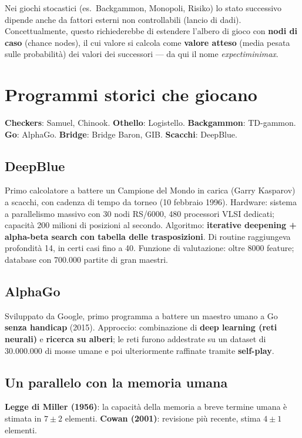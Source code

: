\documentclass[11pt,a4paper]{report}
\begin{document}
Nei giochi stocastici (es.\ Backgammon, Monopoli, Risiko) lo stato successivo dipende anche da fattori esterni non controllabili (lancio di dadi). Concettualmente, questo richiederebbe di estendere l'albero di gioco con \textbf{nodi di caso} (chance nodes), il cui valore si calcola come \textbf{valore atteso} (media pesata sulle probabilità) dei valori dei successori --- da qui il nome \emph{expectiminimax}.

\section{Programmi storici che giocano}

\textbf{Checkers}: Samuel, Chinook. \textbf{Othello}: Logistello. \textbf{Backgammon}: TD-gammon. \textbf{Go}: AlphaGo. \textbf{Bridge}: Bridge Baron, GIB. \textbf{Scacchi}: DeepBlue.

\subsection*{DeepBlue}

Primo calcolatore a battere un Campione del Mondo in carica (Garry Kasparov) a scacchi, con cadenza di tempo da torneo (10 febbraio 1996). Hardware: sistema a parallelismo massivo con 30 nodi RS/6000, 480 processori VLSI dedicati; capacità 200 milioni di posizioni al secondo. Algoritmo: \textbf{iterative deepening + alpha-beta search con tabella delle trasposizioni}. Di routine raggiungeva profondità 14, in certi casi fino a 40. Funzione di valutazione: oltre 8000 feature; database con 700.000 partite di gran maestri.

\subsection*{AlphaGo}

Sviluppato da Google, primo programma a battere un maestro umano a Go \textbf{senza handicap} (2015). Approccio: combinazione di \textbf{deep learning (reti neurali)} e \textbf{ricerca su alberi}; le reti furono addestrate su un dataset di 30.000.000 di mosse umane e poi ulteriormente raffinate tramite \textbf{self-play}.

\subsection*{Un parallelo con la memoria umana}

\textbf{Legge di Miller (1956)}: la capacità della memoria a breve termine umana è stimata in $7 \pm 2$ elementi. \textbf{Cowan (2001)}: revisione più recente, stima $4 \pm 1$ elementi.
\end{document}
